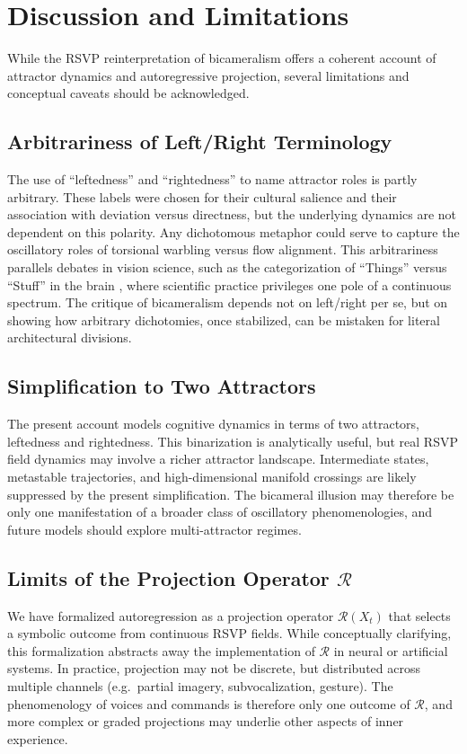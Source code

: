 \documentclass[a4paper,11pt]{article}
\begin{document}
\section{Discussion and Limitations}
\label{sec:discussion}

While the RSVP reinterpretation of bicameralism offers a coherent account of
attractor dynamics and autoregressive projection, several limitations and
conceptual caveats should be acknowledged.

\subsection{Arbitrariness of Left/Right Terminology}
The use of ``leftedness'' and ``rightedness'' to name attractor roles is partly
arbitrary. These labels were chosen for their cultural salience and their
association with deviation versus directness, but the underlying dynamics are
not dependent on this polarity. Any dichotomous metaphor could serve to capture
the oscillatory roles of torsional warbling versus flow alignment. This
arbitrariness parallels debates in vision science, such as the categorization of
``Things'' versus ``Stuff'' in the brain \citep{paulun2023thingsstuff}, where
scientific practice privileges one pole of a continuous spectrum. The critique
of bicameralism depends not on left/right per se, but on showing how arbitrary
dichotomies, once stabilized, can be mistaken for literal architectural
divisions.

\subsection{Simplification to Two Attractors}
The present account models cognitive dynamics in terms of two attractors,
leftedness and rightedness. This binarization is analytically useful, but real
RSVP field dynamics may involve a richer attractor landscape. Intermediate
states, metastable trajectories, and high-dimensional manifold crossings are
likely suppressed by the present simplification. The bicameral illusion may
therefore be only one manifestation of a broader class of oscillatory
phenomenologies, and future models should explore multi-attractor regimes.

\subsection{Limits of the Projection Operator $\mathcal{R}$}
We have formalized autoregression as a projection operator
$\mathcal{R}(X_t)$ that selects a symbolic outcome from continuous RSVP fields.
While conceptually clarifying, this formalization abstracts away the
implementation of $\mathcal{R}$ in neural or artificial systems. In practice,
projection may not be discrete, but distributed across multiple channels (e.g.\
partial imagery, subvocalization, gesture). The phenomenology of voices and
commands is therefore only one outcome of $\mathcal{R}$, and more complex or
graded projections may underlie other aspects of inner experience.
\end{document}
